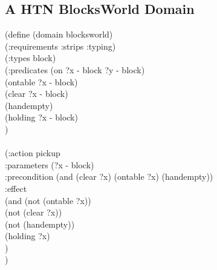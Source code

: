 \begin{appendix}
\chapter{A HTN BlocksWorld Domain}
\label{htnDomain}

\hspace*{1cm}(define (domain blocksworld)
\\ \hspace*{1.5cm}    (:requirements :strips :typing)
\\ \hspace*{1.5cm}    (:types block)
\\ \hspace*{1.5cm}    (:predicates (on ?x - block ?y - block)
\\ \hspace*{2cm}	       (ontable ?x - block)
\\ \hspace*{2cm}	       (clear ?x - block)
\\ \hspace*{2cm}	       (handempty)
\\ \hspace*{2cm}	       (holding ?x - block)
\\ \hspace*{1.5cm}    )
\\ \hspace*{1.5cm}
\\ \hspace*{1.5cm}(:action pickup
\\ \hspace*{2cm}	     :parameters (?x - block)
\\ \hspace*{2cm}	     :precondition (and (clear ?x) (ontable ?x) (handempty))
\\ \hspace*{2cm}	     :effect
\\ \hspace*{2cm}	     (and (not (ontable ?x))
\\ \hspace*{2.5cm}		   (not (clear ?x))
\\ \hspace*{2.5cm}		   (not (handempty))
\\ \hspace*{2.5cm}		   (holding ?x)
\\ \hspace*{2cm})
\\ \hspace*{1.5cm})

\end{appendix}

